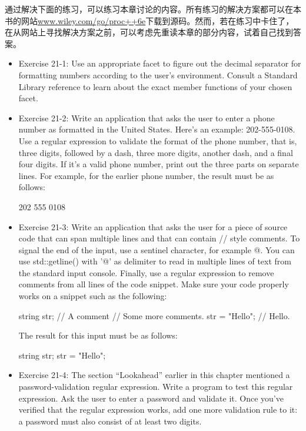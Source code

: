 通过解决下面的练习，可以练习本章讨论的内容。所有练习的解决方案都可以在本书的网站\url{www.wiley.com/go/proc++6e}下载到源码。然而，若在练习中卡住了，在从网站上寻找解决方案之前，可以考虑先重读本章的部分内容，试着自己找到答案。

\begin{itemize}
\item
Exercise 21-1: Use an appropriate facet to figure out the decimal separator for formatting numbers according to the user’s environment. Consult a Standard Library reference to learn about the exact member functions of your chosen facet.

\item
Exercise 21-2: Write an application that asks the user to enter a phone number as formatted in the United States. Here’s an example: 202-555-0108. Use a regular expression to validate the format of the phone number, that is, three digits, followed by a dash, three more digits, another dash, and a final four digits. If it’s a valid phone number, print out the three parts on separate lines. For example, for the earlier phone number, the result must be as follows:

\begin{shell}
202
555
0108
\end{shell}

\item
Exercise 21-3: Write an application that asks the user for a piece of source code that can span multiple lines and that can contain // style comments. To signal the end of the input, use a sentinel character, for example @. You can use std::getline() with '@' as delimiter to read in multiple lines of text from the standard input console. Finally, use a regular expression to remove comments from all lines of the code snippet. Make sure your code properly works on a snippet such as the following:

\begin{cpp}
string str; // A comment // Some more comments.
str = "Hello"; // Hello.
\end{cpp}

The result for this input must be as follows:

\begin{shell}
string str;
str = "Hello";
\end{shell}

\item
Exercise 21-4: The section “Lookahead” earlier in this chapter mentioned a password-validation regular expression. Write a program to test this regular expression. Ask the user to enter a password and validate it. Once you’ve verified that the regular expression works, add one more validation rule to it: a password must also consist of at least two digits.
\end{itemize}